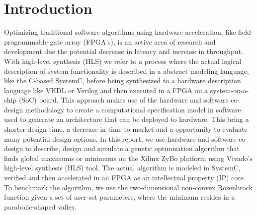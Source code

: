 \section{Introduction}
Optimizing traditional software algorithms using hardware acceleration, like field-programmable gate array (FPGA's), is an active area of research and development due the potential decrease in latency and increase in throughput. With high-level synthesis (HLS) we refer to a process where the actual logical description of system functionality is described in a abstract modeling language, like the C-based SystemC, before being synthesized to a hardware description language like VHDL or Verilog and then executed in a FPGA on a system-on-a-chip (SoC) board. This approach makes use of the hardware and software co-design methodology to create a computational specification model in software used to generate an architecture that can be deployed to hardware. This bring a shorter design time, a decrease in time to market and a opportunity to evaluate many potential design options. In this report, we use hardware and software co-design to describe, design and simulate a genetic optimization algorithm that finds global maximums or minimums on the Xilinx ZyBo platform using Vivado's high-level synthesis (HLS) tool. The actual algorithm is modeled in SystemC, verified and then accelerated in an FPGA as an intellectual property (IP) core. To benchmark the algorithm, we use the two-dimensional non-convex Rosenbrock function\cite{Shang2006} given a set of user-set parameters, where the minimum resides in a parabolic-shaped valley.